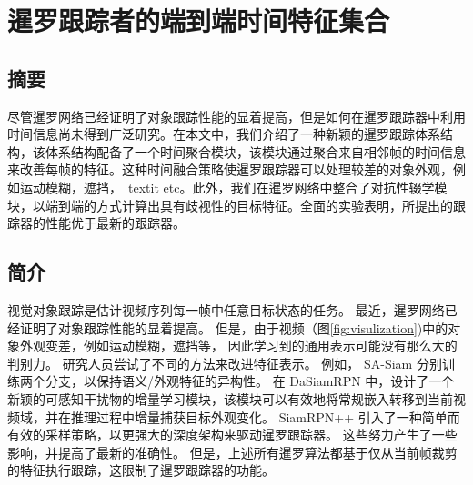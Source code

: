 \chapter{暹罗跟踪者的端到端时间特征集合}\label{chap:end}

\section{摘要}
尽管暹罗网络已经证明了对象跟踪性能的显着提高，但是如何在暹罗跟踪器中利用时间信息尚未得到广泛研究。在本文中，我们介绍了一种新颖的暹罗跟踪体系结构，该体系结构配备了一个时间聚合模块，该模块通过聚合来自相邻帧的时间信息来改善每帧的特征。这种时间融合策略使暹罗跟踪器可以处理较差的对象外观，例如运动模糊，遮挡，\ textit {etc}。此外，我们在暹罗网络中整合了对抗性辍学模块，以端到端的方式计算出具有歧视性的目标特征。全面的实验表明，所提出的跟踪器的性能优于最新的跟踪器。

\section{简介}
\label{sec:intro}
视觉对象跟踪是估计视频序列每一帧中任意目标状态的任务。 
最近，暹罗网络已经证明了对象跟踪性能的显着提高。
但是，由于视频（图\ref{fig:visulization})中的对象外观变差，例如运动模糊，遮挡等，
因此学习到的通用表示可能没有那么大的判别力。
研究人员尝试了不同的方法来改进特征表示。
例如，
SA-Siam \cite{he2018twofold} 分别训练两个分支，以保持语义/外观特征的异构性。
在 DaSiamRPN \cite{zhu2018distractor}中，设计了一个新颖的可感知干扰物的增量学习模块，该模块可以有效地将常规嵌入转移到当前视频域，并在推理过程中增量捕获目标外观变化。
SiamRPN++ \cite{SiamRPN++} 引入了一种简单而有效的采样策略，以更强大的深度架构来驱动暹罗跟踪器。
这些努力产生了一些影响，并提高了最新的准确性。
但是，上述所有暹罗算法都基于仅从当前帧裁剪的特征执行跟踪，这限制了暹罗跟踪器的功能。

